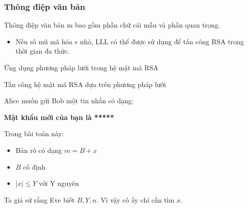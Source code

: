 \documentclass{beamer}
\numberwithin{equation}{section}
\begin{document}
\begin{frame}
\frametitle{Thông điệp văn bản}
Thông điệp văn bản m bao gồm phần chữ cái mẫu và phần quan trọng.

\begin{itemize}
\item Nếu số mũ mã hóa \(e \) nhỏ, LLL có thể được sử dụng để tấn công RSA trong thời gian đa thức.
\end{itemize}
\end{frame}

\begin{frame}{Ứng dụng phương pháp lưới trong hệ mật mã RSA}
\begin{block}{Tấn công hệ mật mã RSA dựa trên phương pháp lưới}

Alice muốn gửi Bob một tin nhắn có dạng:

\textbf{Mật khẩu mới của bạn là *****}

Trong bài toán này:

\begin{itemize}
\item Bản rõ có dạng $m = B + x$
\item $B$ cố định
\item $|x| \leq Y$ với Y nguyên
\end{itemize}

Ta giả sử rằng Eve biết $B, Y, n$. Vì vậy cô ấy chỉ cần tìm $x$.
\end{block}

\end{frame}
\end{document}
